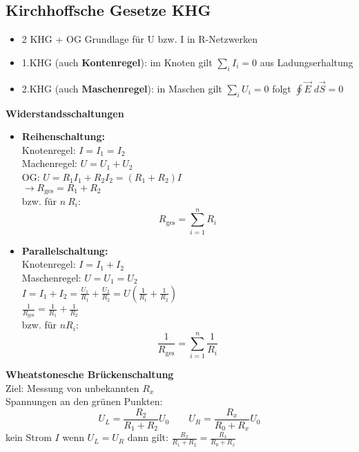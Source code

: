 \documentclass[titlepage,12pt,a4paper,ngerman]{report}
\newcommand{\tx}[1]{\textrm{#1}}
\begin{document}
\subsection{Kirchhoffsche Gesetze KHG}
\begin{itemize}
	\item 2 KHG + OG Grundlage für U bzw. I in R-Netzwerken
	\item 1.KHG (auch \textbf{Kontenregel}): im Knoten gilt $ \sum_i I_i = 0 $ aus Ladungserhaltung
	\item 2.KHG (auch \textbf{Maschenregel}): in Maschen gilt $ \sum_i U_i = 0 $ folgt $ \oint \vec{E} \; d\vec{S} = 0 $
\end{itemize}
\textbf{Widerstandsschaltungen}
\begin{itemize}
	\item \textbf{Reihenschaltung:}\\
	Knotenregel: $ I = I_1 = I_2 $\\
	Machenregel: $ U = U_1 + U_2 $\\
	OG: $ U = R_1 I_1 + R_2 I_2 = (R_1 +R_2) I $\\
	$ \rightarrow R_{\tx{ges}} = R_1 + R_2 $\\
	bzw. für $ n\ R_i:$ $$R_{\tx{ges}} = \sum_{i=1}^{n} R_i $$
	\item \textbf{Parallelschaltung:}\\
	Knotenregel: $ I = I_1 +I_2 $\\
	Maschenregel: $ U = U_1 = U_2 $\\
	$I = I_1 + I_2 = \frac{U_1}{R_1} + \frac{U_2}{R_2} = U (\frac{1}{R_1}+\frac{1}{R_2})$\\
	$ \frac{1}{R_{\tx{ges}}} = \frac{1}{R_1} + \frac{1}{R_2} $\\
	bzw. für $ n R_i:$ $$\frac{1}{R_{\tx{ges}}} = \sum_{i=1}^{n}  \frac{1}{R_i}$$
\end{itemize}
\textbf{Wheatstonesche Brückenschaltung}\\
Ziel: Messung von unbekannten $ R_x $\\
Spannungen an den grünen Punkten:
$$U_L = \frac{R_2}{R_1 + R_2} U_0 \qquad U_R = \frac{R_x}{R_0 + R_x} U_0 $$
kein Strom $I$ wenn $ U_L = U_R $ dann gilt: $ \frac{R_2}{R_1+R_2} = \frac{R_x}{R_0 + R_x} $
\end{document}
